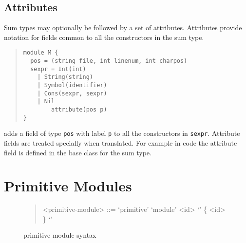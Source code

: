 \subsection{Attributes}
Sum types may optionally be followed by a set of
attributes.
Attributes provide notation for fields common to all the
constructors in the sum type. 
\begin{quote}\begin{lstlisting}[language=ASDL]
module M {
  pos = (string file, int linenum, int charpos)
  sexpr = Int(int)
	| String(string)
	| Symbol(identifier)
	| Cons(sexpr, sexpr)
	| Nil
        attribute(pos p)
}
\end{lstlisting}\end{quote}%
adds a field of type \lstinline[language=ASDL]!pos! with label \lstinline[language=ASDL]!p! to all the constructors in \lstinline[language=ASDL]!sexpr!.
Attribute fields are treated specially when
translated.
For example in \Cplusplus{} code the attribute field is defined in the base class for the sum type.

\section{Primitive Modules}
\label{sec:primitive-module}

\begin{figure}[t]
  \begin{quote}
    \begin{grammar}
      <primitive-module> ::= `primitive' `module' <id> `{' \{ <id> \} `}'
    \end{grammar}%
  \end{quote}%
  \caption{\asdl{} primitive module syntax}
  \label{fig:prim-module-syntax}
\end{figure}%

